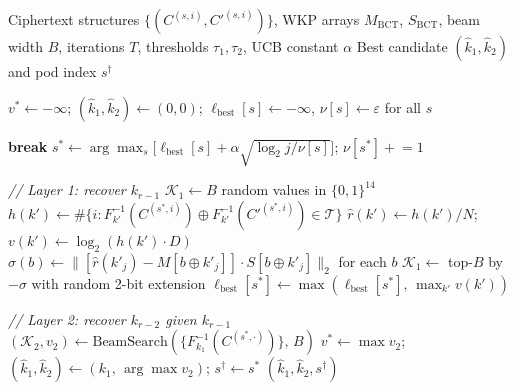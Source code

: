 \documentclass[runningheads]{llncs}
\newcommand{\xor}{\oplus}
\begin{document}
\begin{algorithm}[t]
\caption{UCB Two-Layer Beam Search (Phase 1--2)}
\label{alg:attack}
\begin{algorithmic}[1]
\Require Ciphertext structures $\{(C^{(s,i)}, C'^{(s,i)})\}$,
         WKP arrays $M_{\mathrm{BCT}}$, $S_{\mathrm{BCT}}$,
         beam width $B$, iterations $T$,
         thresholds $\tau_1, \tau_2$, UCB constant $\alpha$
\Ensure Best candidate $(\hat{k}_1, \hat{k}_2)$ and pod index $s^{\dag}$

\State $v^* \gets -\infty$;\quad
       $(\hat{k}_1, \hat{k}_2) \gets (0, 0)$;\quad
       $\ell_{\mathrm{best}}[s] \gets -\infty$,\;
       $\nu[s] \gets \varepsilon$ \quad for all $s$

   \textbf{break} \EndIf
  \State $s^* \!\gets\! \arg\max_{s}\!\bigl[\ell_{\mathrm{best}}[s]
         + \alpha\sqrt{{\log_2 j}/{\nu[s]}}\bigr]$;\quad
         $\nu[s^*] \mathrel{+}= 1$

  \Statex \textit{// Layer 1: recover $k_{r-1}$}
  \State $\mathcal{K}_1 \gets B$ random values in $\{0,1\}^{14}$
      \State $h(k') \gets \#\{i : F_{k'}^{-1}(C^{(s^*,i)}) \xor
             F_{k'}^{-1}(C'^{(s^*,i)}) \in \mathcal{T}\}$
      \State $\hat{r}(k') \gets h(k')/N$;\quad
             $v(k') \gets \log_2(h(k') \cdot D)$
    \EndFor
    \State $\sigma(b) \gets \bigl\lVert[\hat{r}(k'_j) -
           M[b \xor k'_j]] \cdot S[b \xor k'_j]\bigr\rVert_2$
           \;for each $b$
    \State $\mathcal{K}_1 \gets$ top-$B$ by $-\sigma$ with random
           2-bit extension
  \EndFor
  \State $\ell_{\mathrm{best}}[s^*] \gets
         \max(\ell_{\mathrm{best}}[s^*],\, \max_{k'} v(k'))$

  \Statex \textit{// Layer 2: recover $k_{r-2}$ given $k_{r-1}$}
      \State $(\mathcal{K}_2, v_2) \gets \mathrm{BeamSearch}(
             \{F_{k_1}^{-1}(C^{(s^*,\cdot)})\},\, B)$
        \State $v^* \gets \max v_2$;\quad
               $(\hat{k}_1, \hat{k}_2) \gets
               (k_1,\, \arg\max v_2)$;\quad
               $s^{\dag} \gets s^*$
      \EndIf
    \EndFor
  \EndIf
\EndFor
\Return $(\hat{k}_1, \hat{k}_2, s^{\dag})$
\end{algorithmic}
\end{algorithm}
\end{document}
